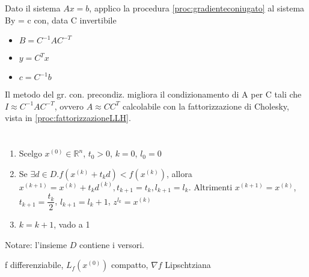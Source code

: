 \askip

\begin{proc}\label{proc:gradienteconiugatoprecondizionato}
Dato il sistema $ Ax = b $, applico la procedura \ref{proc:gradienteconiugato} al sistema By = c con, data C invertibile
\begin{itemize}
\item $ B = C^{-1}AC^{-T} $
\item $ y = C^{T}x $
\item $ c = C^{-1}b $
\end{itemize}
\end{proc}

\askip

Il metodo del gr. con. precondiz. migliora il condizionamento di A per C tali che $ I \approx C^{-1} A C^{-T} $, ovvero $ A \approx CC^T $ calcolabile con la fattorizzazione di Cholesky, vista in \ref{proc:fattorizzazioneLLH}.

\section{}
\begin{proc}
\begin{enumerate}
\item Scelgo $ x^{(0)} \in \mathbb{R}^n $, $ t_0 > 0 $, $ k = 0 $, $ l_0 = 0 $
\item Se $ \exists d \in D. f(x^{(k)} + t_k d) < f(x^{(k)}) $, allora $ x^{(k+1)} = x^{(k)} + t_k d^{(k)}, t_{k+1} = t_k, l_{k+1} = l_k $. Altrimenti $ x^{(k+1)} = x^{(k)} $, $ t_{k+1} = \dfrac{t_k}{2} $, $ l_{k+1} = l_k + 1 $, $ z^{l_k} = x^{(k)} $
\item $ k = k+1 $, vado a 1
\end{enumerate}
\end{proc}

Notare: l'insieme $ D $ contiene i versori.

\askip

 f differenziabile, $ L_f(x^{(0)}) $ compatto, $ \nabla f $ Lipschtziana